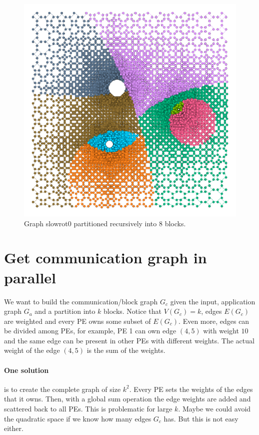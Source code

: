 \documentclass[a4paper,10pt]{article}
\begin{document}
\begin{figure}
\includegraphics[scale=0.2]{slowrot_RecursiveKMeans_k8}
\caption{Graph slowrot0 partitioned recursively into 8 blocks. }
\end{figure}



\section*{Get communication graph in parallel}

We want to build the communication/block graph $G_c$ given the input, application graph $G_a$ and a
partition into $k$ blocks. Notice that $V(G_c)=k$, edges $E(G_c)$ are weighted and every PE owns some subset 
of $E(G_c)$. Even more,
edges can be divided among PEs, for example, PE 1 can own edge $(4,5)$ with weight $10$ and the same
edge can be present in other PEs with different weights. The actual weight of the edge $(4,5)$ is the
sum of the weights.

\paragraph*{One solution} is to create the complete graph of size $k^2$. Every PE sets the weights of the edges that
it owns. Then, with a global sum operation the edge weights are added and scattered back to all PEs.
This is problematic for large $k$.
Maybe we could avoid the quadratic space if we know how many edges $G_c$ has. But this is not easy either.
\end{document}
